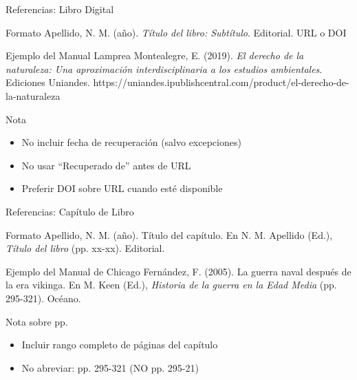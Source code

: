 \documentclass[spanish,aspectratio=169]{beamer}
\begin{document}
\begin{frame}{Referencias: Libro Digital}
	\begin{block}{Formato}
		\small
		Apellido, N. M. (año). \textit{Título del libro: Subtítulo}. Editorial. URL o DOI
	\end{block}
	
	\begin{exampleblock}{Ejemplo del Manual}
		\footnotesize
		Lamprea Montealegre, E. (2019). \textit{El derecho de la naturaleza: Una aproximación interdisciplinaria a los estudios ambientales}. Ediciones Uniandes. https://uniandes.ipublishcentral.com/product/el-derecho-de-la-naturaleza
	\end{exampleblock}
	
	\begin{alertblock}{Nota}
		\begin{itemize}
			\item No incluir fecha de recuperación (salvo excepciones)
			\item No usar ``Recuperado de'' antes de URL
			\item Preferir DOI sobre URL cuando esté disponible
		\end{itemize}
	\end{alertblock}
\end{frame}

\begin{frame}{Referencias: Capítulo de Libro}
	\begin{block}{Formato}
		\small
		Apellido, N. M. (año). Título del capítulo. En N. M. Apellido (Ed.), \textit{Título del libro} (pp. xx-xx). Editorial.
	\end{block}
	
	\begin{exampleblock}{Ejemplo del Manual de Chicago}
		\footnotesize
		Fernández, F. (2005). La guerra naval después de la era vikinga. En M. Keen (Ed.), \textit{Historia de la guerra en la Edad Media} (pp. 295-321). Océano.
	\end{exampleblock}
	
	\begin{block}{Nota sobre pp.}
		\begin{itemize}
			\item Incluir rango completo de páginas del capítulo
			\item No abreviar: pp. 295-321 (NO pp. 295-21)
		\end{itemize}
	\end{block}
\end{frame}
\end{document}
